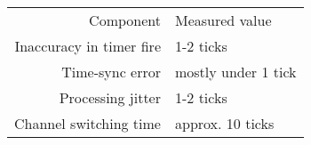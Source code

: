 \begin{tabular}{|r|l|}
Component & Measured value\\
Inaccuracy in timer fire & 1-2 ticks\\
Time-sync error & mostly under 1 tick\\
Processing jitter & 1-2 ticks\\
Channel switching time & approx. 10 ticks\\
\end{tabular}
